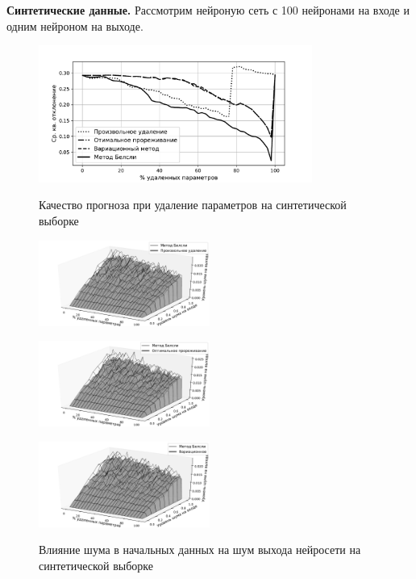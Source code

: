 \textbf{Синтетические данные.} Рассмотрим нейроную сеть с 100 нейронами на входе и одним нейроном на выходе.

\begin{figure}[h!t]\center
\includegraphics[width=0.8\textwidth]{plots/grabovoy/Data1/All.pdf}\\
\caption{Качество прогноза при удаление параметров на синтетической выборке}
\label{Data1All}
\end{figure}

\begin{figure}[h!t]\center
\begin{minipage}[t]{.5\textwidth}
{\includegraphics[width=0.5\textwidth]{plots/grabovoy/Data1/RandomNoise3D.pdf}}
\end{minipage}
\begin{minipage}[t]{.5\textwidth}
{\includegraphics[width=0.5\textwidth]{plots/grabovoy/Data1/OBDNoise3D.pdf}}
\end{minipage}

\begin{minipage}[t]{.5\textwidth}
{\includegraphics[width=0.5\textwidth]{plots/grabovoy/Data1/VariationalNoise3D.pdf}}
\end{minipage}

\caption{Влияние шума в начальных данных на шум выхода нейросети на синтетической выборке}
\label{Data1Noise}
\end{figure}


